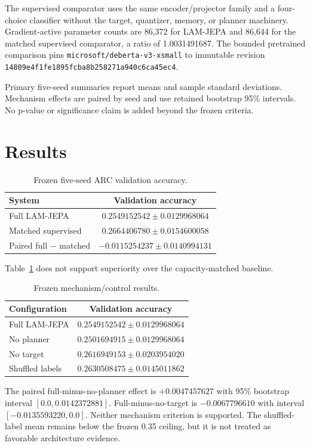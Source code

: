 \documentclass[conference]{IEEEtran}
\begin{document}
The supervised comparator uses the same encoder/projector family and a four-choice classifier without the target, quantizer, memory, or planner machinery. Gradient-active parameter counts are 86,372 for LAM-JEPA and 86,644 for the matched supervised comparator, a ratio of 1.0031491687. The bounded pretrained comparison pins \texttt{microsoft/deberta-v3-xsmall} to immutable revision \texttt{14809e4f1fe1895fcba8b258271a940c6ca45ec4}.

Primary five-seed summaries report means and sample standard deviations. Mechanism effects are paired by seed and use retained bootstrap 95\% intervals. No p-value or significance claim is added beyond the frozen criteria.

\section{Results}
\begin{table}[t]
\caption{Frozen five-seed ARC validation accuracy.}
\label{tab:main}
\centering
\small
\begin{tabular}{lc}
\toprule
System & Validation accuracy \\
\midrule
Full LAM-JEPA & $0.2549152542\pm0.0129968064$ \\
Matched supervised & $0.2664406780\pm0.0154600058$ \\
Paired full $-$ matched & $-0.0115254237\pm0.0140994131$ \\
\bottomrule
\end{tabular}
\end{table}

Table~\ref{tab:main} does not support superiority over the capacity-matched baseline.

\begin{table}[t]
\caption{Frozen mechanism/control results.}
\label{tab:abl}
\centering
\small
\begin{tabular}{lc}
\toprule
Configuration & Validation accuracy \\
\midrule
Full LAM-JEPA & $0.2549152542\pm0.0129968064$ \\
No planner & $0.2501694915\pm0.0129968064$ \\
No target & $0.2616949153\pm0.0203954020$ \\
Shuffled labels & $0.2630508475\pm0.0145011862$ \\
\bottomrule
\end{tabular}
\end{table}

The paired full-minus-no-planner effect is $+0.0047457627$ with 95\% bootstrap interval $[0.0,0.0142372881]$. Full-minus-no-target is $-0.0067796610$ with interval $[-0.0135593220,0.0]$. Neither mechanism criterion is supported. The shuffled-label mean remains below the frozen 0.35 ceiling, but it is not treated as favorable architecture evidence.
\end{document}

